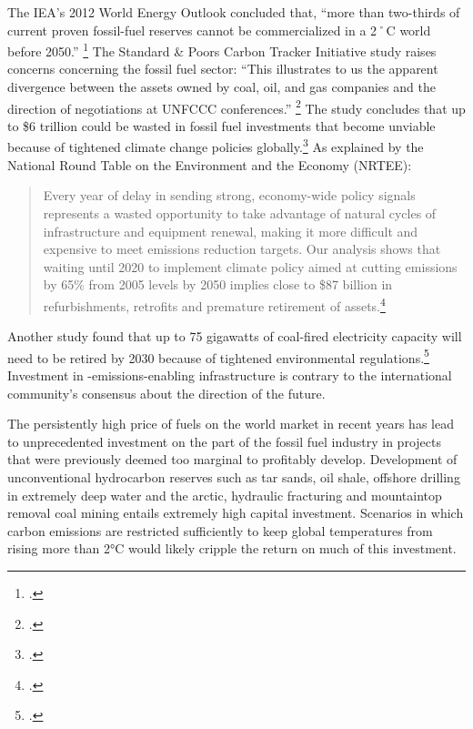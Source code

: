 The IEA's 2012 World Energy Outlook concluded that, ``more than two-thirds of current proven fossil-fuel reserves cannot be commercialized in a 2˚C world before 2050.'' \footcite{IEA2012}
The Standard \& Poors Carbon Tracker Initiative study raises concerns concerning the fossil fuel sector: ``This illustrates to us the apparent divergence between the assets owned by coal, oil, and gas companies and the direction of negotiations at UNFCCC conferences.'' \footcite{SandPConstrained}
The study concludes that up to \$6 trillion could be wasted in fossil fuel investments that become unviable because of tightened climate change policies globally.\footcite[][]{SixTrillionBubble}
As explained by the National Round Table on the Environment and the Economy (NRTEE):
\begin{quote}
Every year of delay in sending strong, economy-wide policy signals represents a wasted opportunity to take advantage of natural cycles of infrastructure and equipment renewal, making it more difficult and expensive to meet emissions reduction targets. Our analysis shows that waiting until 2020 to implement climate policy aimed at cutting emissions by 65\% from 2005 levels by 2050 implies close to \$87 billion in refurbishments, retrofits and premature retirement of assets.\footcite[][p. 19]{FramingFuture}
\end{quote}
Another study found that up to 75 gigawatts of coal-fired electricity capacity will need to be retired by 2030 because of tightened environmental regulations.\footcite[][p. 10]{RisksInCoal}
Investment in -emissions-enabling infrastructure is contrary to the international community's consensus about the direction of the future.


The persistently high price of fuels on the world market in recent years has lead to unprecedented investment on the part of the fossil fuel industry in projects that were previously deemed too marginal to profitably develop. 
Development of unconventional hydrocarbon reserves such as tar sands, oil shale, offshore drilling in extremely deep water and the arctic, hydraulic fracturing and mountaintop removal coal mining entails extremely high capital investment. 
Scenarios in which carbon emissions are restricted sufficiently to keep global temperatures from rising more than 2°C would likely cripple the return on much of this investment.



